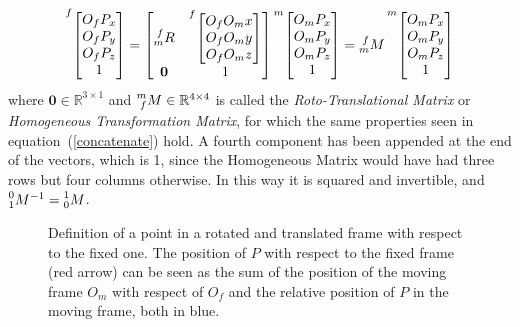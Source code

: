 \documentclass[a4paper,12pt,oneside]{report}
\begin{document}
\begin{equation}
  \prescript{f}{}{\begin{bmatrix}
    O_fP_x\\
    O_fP_y\\
    O_fP_z\\
    1
  \end{bmatrix}}=\begin{bmatrix}
    \prescript{f}{m}{R}&\prescript{f}{}{\begin{bmatrix}
      O_fO_mx\\
      O_fO_my\\
      O_fO_mz\\
    \end{bmatrix}}\\
    \mathbf{0}&1
  \end{bmatrix}\prescript{m}{}{\begin{bmatrix}
      O_mP_x\\
      O_mP_y\\
      O_mP_z\\
      1
    \end{bmatrix}}=\prescript{f}{m}{M}\prescript{m}{}{\begin{bmatrix}
      O_mP_x\\
      O_mP_y\\
      O_mP_z\\
      1
    \end{bmatrix}}
\label{roto_translation}
\end{equation}
where $\mathbf{0} \in \mathbb{R}^{3\times1}$ and $\prescript{m}{f}{M} \in \mathbb{R}^{4\times4}$ is called the \textit{Roto-Translational Matrix} or \textit{Homogeneous Transformation Matrix}, for which the same properties seen in equation~(\ref{concatenate}) hold. A fourth component has been appended at the end of the vectors, which is 1, since the Homogeneous Matrix would have had three rows but four columns otherwise. In this way it is squared and invertible, and $\prescript{0}{1}{M}^{-1}=\prescript{1}{0}{M}$.
\begin{figure}[h]
  \centering
  
  \caption{Definition of a point in a rotated and translated frame with respect to the fixed one. The position of $P$ with respect to the fixed frame (red arrow) can be seen as the sum of the position of the moving frame $O_m$ with respect of $O_f$ and the relative position of $P$ in the moving frame, both in blue.}
  \label{translation}
\end{figure}
\end{document}
